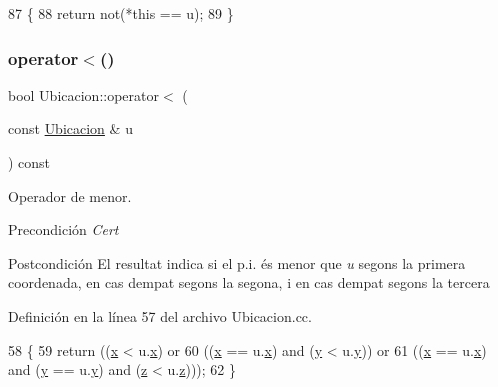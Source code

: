 \begin{DoxyCode}
87                                                    \{
88   \textcolor{keywordflow}{return} not(*\textcolor{keyword}{this} == u);
89 \}
\end{DoxyCode}
\mbox{\label{class_ubicacion_a4d19b7ea907107a1c25677c3785a0a69}} 
\subsubsection{\texorpdfstring{operator$<$()}{operator<()}}
{\footnotesize\ttfamily bool Ubicacion\+::operator$<$ (\begin{DoxyParamCaption}\item[{const \hyperlink{class_ubicacion}{Ubicacion} \&}]{u }\end{DoxyParamCaption}) const}



Operador de menor. 

\begin{DoxyPrecond}{Precondición}
{\itshape Cert} 
\end{DoxyPrecond}
\begin{DoxyPostcond}{Postcondición}
El resultat indica si el p.\+i. és menor que {\itshape u} segons la primera coordenada, en cas d\textquotesingle{}empat segons la segona, i en cas d\textquotesingle{}empat segons la tercera 
\end{DoxyPostcond}


Definición en la línea 57 del archivo Ubicacion.\+cc.


\begin{DoxyCode}
58 \{
59   \textcolor{keywordflow}{return} ((\hyperlink{class_ubicacion_aa025967df0ca8761587b09a38cf5b798}{x} < u.\hyperlink{class_ubicacion_aa025967df0ca8761587b09a38cf5b798}{x}) or
60           ((\hyperlink{class_ubicacion_aa025967df0ca8761587b09a38cf5b798}{x} == u.\hyperlink{class_ubicacion_aa025967df0ca8761587b09a38cf5b798}{x}) and (\hyperlink{class_ubicacion_ab314f05b8da651aabb8a623467919a94}{y} < u.\hyperlink{class_ubicacion_ab314f05b8da651aabb8a623467919a94}{y})) or
61           ((\hyperlink{class_ubicacion_aa025967df0ca8761587b09a38cf5b798}{x} == u.\hyperlink{class_ubicacion_aa025967df0ca8761587b09a38cf5b798}{x}) and (\hyperlink{class_ubicacion_ab314f05b8da651aabb8a623467919a94}{y} == u.\hyperlink{class_ubicacion_ab314f05b8da651aabb8a623467919a94}{y}) and (\hyperlink{class_ubicacion_ad74770f35bf4b18d3959b78cd90b6eb0}{z} < u.\hyperlink{class_ubicacion_ad74770f35bf4b18d3959b78cd90b6eb0}{z})));
62 \}
\end{DoxyCode}
\mbox{\label{class_ubicacion_ac3b54c312d4e2e01c6bda1205b39ae3b}} 

